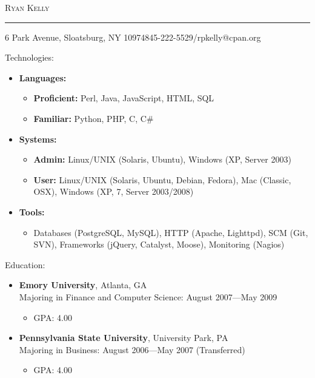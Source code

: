 \documentclass[10pt,oneside]{article}
\makeatletter
\newcommand{\name}{Ryan Kelly}
\newcommand{\addr}{6 Park Avenue, Sloatsburg, NY 10974}
\newcommand{\phone}{845-222-5529}
\newcommand{\email}{rpkelly@cpan.org}
\newcommand{\bigname}[1]{
	\begin{flushleft}\fontfamily{phv}\selectfont\Huge\scshape#1\end{flushleft}
}
\newenvironment{ressection}[1]{
	\vspace{1pt}
	{\fontfamily{phv}\selectfont\Large#1}
	\begin{itemize}
	\vspace{1pt}
}{
	\end{itemize}
}
\newcommand{\resitem}[1]{
	\vspace{-4pt}
	\item \begin{flushleft} #1 \end{flushleft}
}
\newcommand{\ressubitem}[1]{
	\vspace{-2pt}
	\item \begin{flushleft} #1 \end{flushleft}
}
\newcommand{\resbigitem}[3]{
	\vspace{-5pt}
	\item
	\textbf{#1}, #2 \\
	#3
}
\newenvironment{ressubsec}[3]{
	\resbigitem{#1}{#2}{#3}
	\vspace{-2pt}
	\begin{itemize}
}{
	\end{itemize}
}
\newenvironment{reslist}[1]{
	\resitem{\textbf{#1}}
	\vspace{-5pt}
	\begin{itemize}
}{
	\end{itemize}
}
\makeatother
\begin{document}
 \selectfont

\bigname{\name}

\vspace{-8pt} \rule{\textwidth}{1pt}

\vspace{-1pt} {\small \addr \hfill \phone/\email}

\vspace{8 pt}

\begin{ressection}{Technologies:}

    \begin{reslist}{Languages:}
        \ressubitem{\textbf{Proficient:} Perl, Java, JavaScript, HTML, SQL}
        \ressubitem{\textbf{Familiar:} Python, PHP, C, C\#}
    \end{reslist}

    \begin{reslist}{Systems:}
        \ressubitem{\textbf{Admin:} Linux/UNIX (Solaris, Ubuntu), Windows (XP, Server 2003)}
        \ressubitem{\textbf{User:} Linux/UNIX (Solaris, Ubuntu, Debian, Fedora), Mac (Classic, OSX), Windows (XP, 7, Server 2003/2008)}
    \end{reslist}

    \begin{reslist}{Tools:}
       \ressubitem{Databases (PostgreSQL, MySQL), HTTP (Apache, Lighttpd), SCM (Git, SVN), Frameworks (jQuery, Catalyst, Moose), Monitoring (Nagios)} 
    \end{reslist}

\end{ressection}

\begin{ressection}{Education:}

	\begin{ressubsec}{Emory University}{Atlanta, GA}{Majoring in Finance and Computer Science: August 2007---May 2009}
		\ressubitem{GPA: 4.00}
	\end{ressubsec}

	\begin{ressubsec}{Pennsylvania State University}{University Park, PA}{Majoring in Business: August 2006---May 2007 (Transferred)}
		\ressubitem{GPA: 4.00}
	\end{ressubsec}

\end{ressection}
\end{document}
